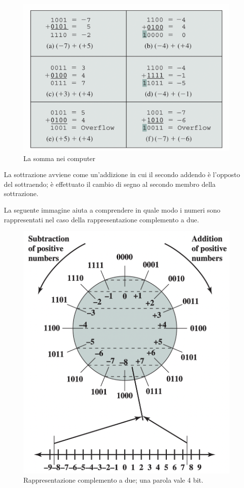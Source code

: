 \documentclass{article}
\begin{document}
\begin{figure}[h]
	\centering
	\includegraphics[scale=0.2]{immagini/somma}
	\caption{La somma nei computer}
\end{figure}

La sottrazione avviene come un'addizione in cui il secondo addendo è l'opposto del sottraendo; è effettuato il cambio di segno al secondo membro della sottrazione.

La seguente immagine aiuta a comprendere in quale modo i numeri sono rappresentati nel caso della rappresentazione complemento a due.

\begin{figure}[h]
	\centering
	\includegraphics[scale=0.2]{immagini/complementoadue}
	\caption{Rappresentazione complemento a due; una parola vale 4 bit.}
\end{figure}
\end{document}
